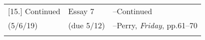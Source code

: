 \documentclass[article,oneside]{memoir}
\begin{document}
\begin{center}
\begin{longtable}{p{4.5cm}p{2cm}p{6cm}}
						
[15.] Continued 	      		& Essay 7			&  --Continued \\
(5/6/19)				      	& (due 5/12)			      	&  --Perry, \emph{Friday}, pp.61--70 \\ \\  [1.8\baselineskip]





\end{longtable}
\end{center}






\end{document}
